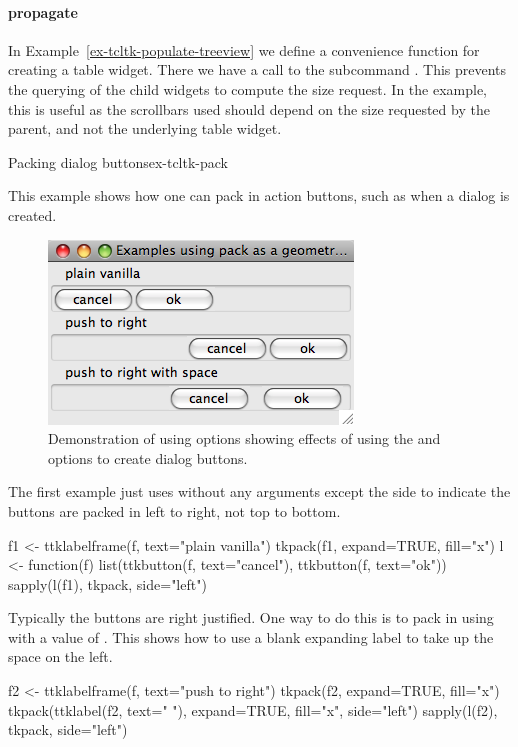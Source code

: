 %


\paragraph{propagate}
In Example~\ref{ex-tcltk-populate-treeview} we define a convenience
function for creating a table widget. There we have a call to the
subcommand .  This prevents the querying
of the child widgets to compute the size request. In the example, this
is useful as the scrollbars used should depend on the size requested
by the parent, and not the underlying table widget.


\begin{example}{Packing dialog buttons}{ex-tcltk-pack}


This example shows how one can pack in action buttons, such as when a
dialog is created.

\begin{figure}
  \centering
  \includegraphics[width=.5\textwidth]{fig-tcltk-pack-buttons.png}
  \caption{Demonstration of using  options showing
    effects of using the 
    and  options to create
    dialog buttons.}
  \label{fig:tcltk-pack-buttons}
\end{figure}


The first example just uses  without any arguments except
the side to indicate the buttons are packed in left to right, not top
to bottom.
\begin{Schunk}
\begin{Sinput}
 f1 <- ttklabelframe(f, text="plain vanilla")
 tkpack(f1, expand=TRUE, fill="x")
 l <- function(f) 
   list(ttkbutton(f, text="cancel"), ttkbutton(f, text="ok"))
 sapply(l(f1), tkpack, side="left")
\end{Sinput}
\end{Schunk}

Typically the buttons are right justified. One way to do this is to
pack in using  with a value of . This shows
how to use a blank expanding label to take up the space on the left.
\begin{Schunk}
\begin{Sinput}
 f2 <- ttklabelframe(f, text="push to right")
 tkpack(f2, expand=TRUE, fill="x")
 tkpack(ttklabel(f2, text=" "), 
        expand=TRUE, fill="x", side="left")
 sapply(l(f2), tkpack, side="left")
\end{Sinput}
\end{Schunk}


\end{example}

